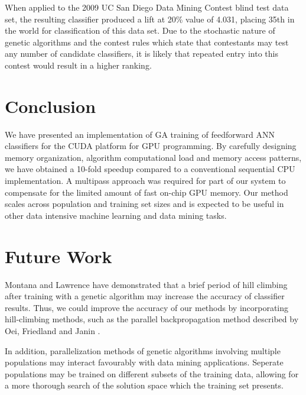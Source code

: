 \documentclass[11pt]{article}       %
\begin{document}
When applied to the 2009 UC San Diego Data Mining Contest blind test data set, the resulting classifier produced a lift at 20\% value of 4.031, placing 35th in the world for classification of this data set. Due to the stochastic nature of genetic algorithms and the contest rules which state that contestants may test any number of candidate classifiers, it is likely that repeated entry into this contest would result in a higher ranking.
\section{Conclusion} \label{concl}
We have presented an implementation of GA training of feedforward ANN classifiers for the CUDA platform for GPU programming. By carefully designing memory organization, algorithm computational load and memory access patterns, we have obtained a 10-fold speedup compared to a conventional sequential CPU implementation. A multipass approach was required for part of our system to compensate for the limited amount of fast on-chip GPU memory. Our method scales across population and training set sizes and is expected to be useful in other data intensive machine learning and data mining tasks.

\section{Future Work} \label{future}
Montana and Lawrence \cite{GA-ANN} have demonstrated that a brief period of hill climbing after training with a genetic algorithm may increase the accuracy of classifier results. Thus, we could improve the accuracy of our methods by incorporating hill-climbing methods, such as the parallel backpropagation method described by Oei, Friedland and Janin \cite{backprop}.

In addition, parallelization methods of genetic algorithms involving multiple populations \cite{Alba1999} may interact favourably with data mining applications.  Seperate populations may be trained on different subsets of the training data, allowing for a more thorough search of the solution space which the training set presents.



\end{document}
